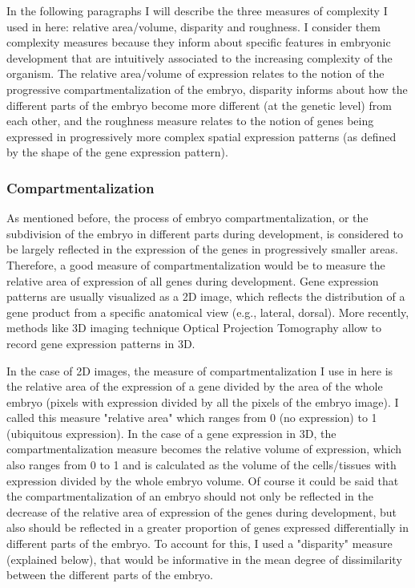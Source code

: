 
In the following paragraphs I will describe the three measures of complexity I used in here: relative area/volume, disparity and roughness. I consider them complexity measures because they inform about specific features in embryonic development that are intuitively associated to the increasing complexity of the organism. The relative area/volume of expression relates to the notion of the progressive compartmentalization of the embryo, disparity informs about how the different parts of the embryo become more different (at the genetic level) from each other, and the roughness measure relates to the notion of genes being expressed in progressively more complex spatial expression patterns (as defined by the shape of the gene expression pattern).


\subsubsection{Compartmentalization}

As mentioned before, the process of embryo compartmentalization, or the subdivision of the embryo in different parts during development, is considered to be largely reflected in the expression of the genes in progressively smaller areas. Therefore, a good measure of compartmentalization would be to measure the relative area of expression of all genes during development.
Gene expression patterns are usually visualized as a 2D image, which reflects the distribution of a gene product from a specific anatomical view (e.g., lateral, dorsal).  More recently, methods like 3D imaging technique Optical Projection Tomography  \citep{Sharpe2003,Summerhurst2008} allow to record gene expression patterns in 3D.

In the case of 2D images, the measure of compartmentalization I use in here is the relative area of the expression of a gene divided by the area of the whole embryo (pixels with expression divided by all the pixels of the embryo image). I called this measure "relative area" which ranges from 0 (no expression) to 1 (ubiquitous expression). 
In the case of a gene expression in 3D, the compartmentalization measure becomes the relative volume of expression, which also ranges from 0 to 1 and is calculated as the volume of the cells/tissues with expression divided by the whole embryo volume.
Of course it could be said that the compartmentalization of an embryo should not only be reflected in the decrease of the relative area of expression of the genes during development, but also should be reflected in a greater proportion of genes expressed differentially in different parts of the embryo. To account for this, I used a "disparity" measure (explained below), that would be informative in the mean degree of dissimilarity between the different parts of the embryo.

